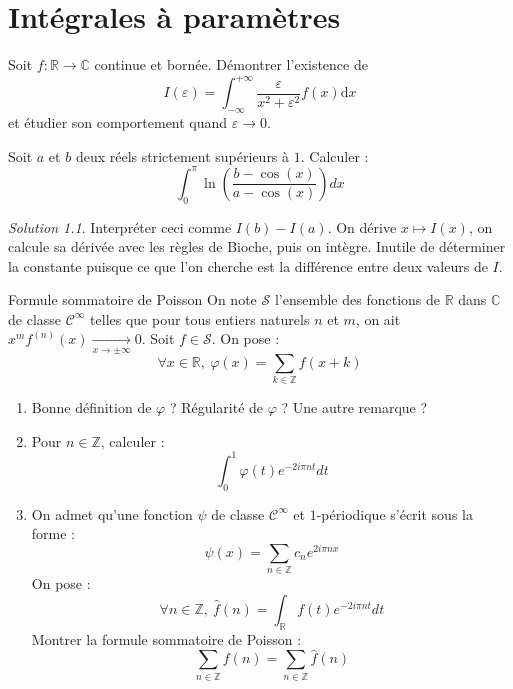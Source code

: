 \documentclass[french]{book}
\newcommand{\Z}{\mathbb{Z}}
\newcommand{\R}{\mathbb{R}}
\newcommand{\C}{\mathbb{C}}
\renewcommand{\d}{\text{d}}
\theoremstyle{definition}
\theoremstyle{remark}
\newtheorem*{sol}{Solution}
\begin{document}
\chapter{Intégrales à paramètres}

\begin{exo}[0]{}
	Soit $f:\R\to\C$ continue et bornée. Démontrer l'existence de $$I(\varepsilon)=\int_{-\infty}^{+\infty}\frac{\varepsilon}{x^2+\varepsilon^2}f(x)\d x$$ et étudier son comportement quand $\varepsilon\xrightarrow{}0$.
\end{exo}

\begin{exo}[2]{}
	Soit $a$ et $b$ deux réels strictement supérieurs à $1$. Calculer : $$\int_{0}^{\pi}\ln\left(\frac{b-\cos(x)}{a-\cos(x)}\right)dx$$
\end{exo}
\begin{sol}
	Interpréter ceci comme $I(b)-I(a)$. On dérive $x\mapsto I(x)$, on calcule sa dérivée avec les règles de Bioche, puis on intègre. Inutile de déterminer la constante puisque ce que l'on cherche est la différence entre deux valeurs de $I$.
\end{sol}

\begin{exo}[2]{Formule sommatoire de Poisson}
	On note $\mathcal{S}$ l'ensemble des fonctions de $\R$ dans $\C$ de classe $\mathcal{C}^\infty$ telles que pour tous entiers naturels $n$ et $m$, on ait $x^mf^{(n)}(x)\xrightarrow[x\to\pm\infty]{}0$. Soit $f\in\mathcal{S}$. On pose : $$\forall x\in \R,\ \varphi(x)=\sum_{k\in\Z}f(x+k)$$
	\begin{enumerate}
		\item Bonne définition de $\varphi$ ? Régularité de $\varphi$ ? Une autre remarque ?
		\item Pour $n\in\Z$, calculer : $$\int_{0}^{1}\varphi(t)e^{-2i\pi nt}dt$$
		\item On admet qu'une fonction $\psi$ de classe $\mathcal{C}^\infty$ et $1$-périodique s'écrit sous la forme : $$\psi(x)=\sum_{n\in\Z}c_ne^{2i\pi nx}$$ On pose : $$\forall n\in\Z,\ \hat{f}(n)=\int_{\R}f(t)e^{-2i\pi nt}dt$$ Montrer la formule sommatoire de Poisson : $$\sum_{n\in\Z}f(n)=\sum_{n\in\Z}\hat{f}(n)$$
	\end{enumerate}
\end{exo}
\end{document}
